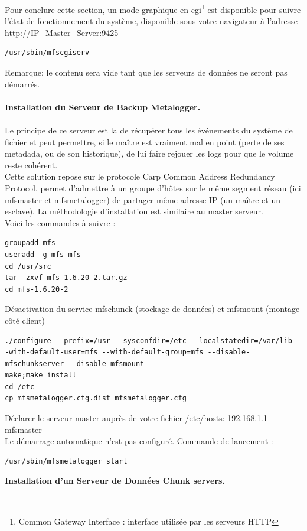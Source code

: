 \documentclass[12pt]{report}
\begin{document}
Pour conclure cette section, un mode graphique en cgi\footnote{Common Gateway Interface : interface utilisée par les serveurs HTTP} est disponible pour suivre l'état de fonctionnement du système, disponible sous votre navigateur à l'adresse http://IP\_Master\_Server:9425
  \begin{lstlisting}
/usr/sbin/mfscgiserv
	  \end{lstlisting}
Remarque: le contenu sera vide tant que les serveurs de données ne seront pas démarrés.\\\\
\textbf{Installation du Serveur de Backup Metalogger.}\\\\
Le principe de ce serveur est la de récupérer tous les événements du système de fichier et peut permettre, si le maître est vraiment mal en point (perte de ses metadada, ou de son historique), de lui faire rejouer les logs pour que le volume reste cohérent.\\
Cette solution repose sur le protocole Carp \og Common Address Redundancy Protocol\fg, permet d'admettre à un groupe d'hôtes sur le même segment réseau (ici mfsmaster et mfsmetalogger) de partager même adresse IP (un maître et un esclave). 
La méthodologie d'installation est similaire au master serveur.\\
Voici les commandes à suivre :\\
  \begin{lstlisting}
groupadd mfs
useradd -g mfs mfs
cd /usr/src
tar -zxvf mfs-1.6.20-2.tar.gz
cd mfs-1.6.20-2
	  \end{lstlisting}
Désactivation du service mfschunck (stockage de données) et mfsmount (montage côté client)
  \begin{lstlisting}
./configure --prefix=/usr --sysconfdir=/etc --localstatedir=/var/lib --with-default-user=mfs --with-default-group=mfs --disable-mfschunkserver --disable-mfsmount
make;make install
cd /etc
cp mfsmetalogger.cfg.dist mfsmetalogger.cfg
	  \end{lstlisting}
Déclarer le serveur master auprès de votre fichier /etc/hosts: 192.168.1.1  mfsmaster\\
Le démarrage automatique n'est pas configuré. Commande de lancement :
  \begin{lstlisting}
/usr/sbin/mfsmetalogger start
	  \end{lstlisting}
\textbf{Installation d'un Serveur de Données Chunk servers.}\\\\
\end{document}
